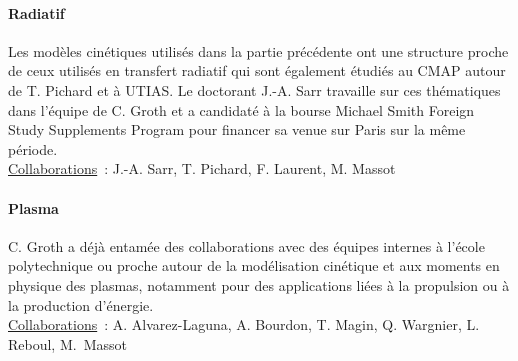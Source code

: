 \documentclass[12pt]{article}
\begin{document}
\paragraph{Radiatif}
Les modèles cinétiques utilisés dans la partie précédente ont une structure proche de ceux utilisés en transfert radiatif qui sont également étudiés au CMAP autour de T. Pichard et à UTIAS. Le doctorant J.-A. Sarr travaille sur ces thématiques dans l'équipe de C. Groth et a candidaté à la bourse \og{}Michael Smith Foreign Study Supplements Program\fg{} pour financer sa venue sur Paris sur la même période.  \\
%
\underline{Collaborations}~: J.-A. Sarr, T. Pichard, F. Laurent, M. Massot

\paragraph{Plasma}
C. Groth a déjà entamée des collaborations avec des équipes internes à l'école polytechnique ou proche autour de la modélisation cinétique et aux moments en physique des plasmas, notamment pour des applications liées à la propulsion ou à la production d'énergie. \\
%
\underline{Collaborations}~: A. Alvarez-Laguna, A. Bourdon, T. Magin, Q. Wargnier, L. Reboul, M.~Massot
\end{document}
